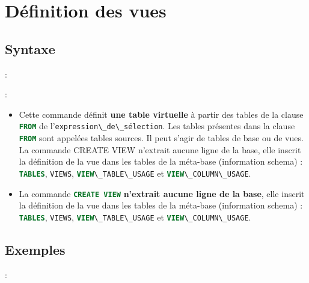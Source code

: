\documentclass[10pt]{beamer}
\begin{document}
\section{Définition des vues}
\subsection{Syntaxe}
\begin{frame}{\secname : \subsecname}
    
\end{frame}

\begin{frame}{\secname : \subsecname}
    \begin{itemize}
        \item Cette commande définit \textbf{une table virtuelle} à partir des tables de la clause \lstinline[language=sql]!FROM! de l'\lstinline[language=bnf]!expression\_de\_sélection!.  Les tables présentes dans la clause \lstinline[language=sql]!FROM! sont appelées tables sources.  Il peut s'agir de tables de base ou de vues.
              La commande CREATE VIEW n'extrait aucune ligne de la base, elle inscrit la définition de la vue dans les tables de la méta-base (information schema) : \lstinline[language=sql]!TABLES!, \lstinline[language=sql]!VIEWS!, \lstinline[language=sql]!VIEW\_TABLE\_USAGE! et \lstinline[language=sql]!VIEW\_COLUMN\_USAGE!.
        \item La commande \lstinline[language=sql]!CREATE VIEW! \textbf{n'extrait aucune ligne de la base}, elle inscrit la définition de la vue dans les tables de la méta-base (information schema) : \lstinline[language=sql]!TABLES!, \lstinline[language=sql]!VIEWS!, \lstinline[language=sql]!VIEW\_TABLE\_USAGE! et \lstinline[language=sql]!VIEW\_COLUMN\_USAGE!.

    \end{itemize}
\end{frame}
\subsection{Exemples}
\begin{frame}{\secname : \subsecname}
    
\end{frame}
\end{document}
